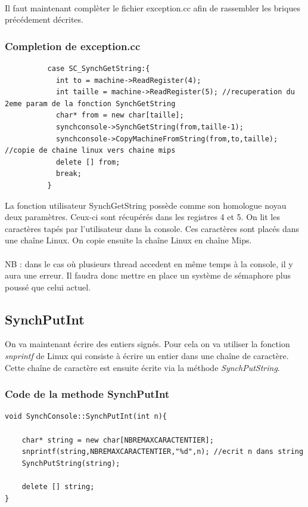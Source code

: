 \documentclass[a4paper,10pt]{article}
\begin{document}
     ~~\\
     Il faut maintenant complèter le fichier exception.cc afin de rassembler les briques précédement décrites.\\
    \textcolor{TealBlue}{\subsubsection*{Completion de exception.cc}}
    \begin{lstlisting}
          case SC_SynchGetString:{
            int to = machine->ReadRegister(4);
            int taille = machine->ReadRegister(5); //recuperation du 2eme param de la fonction SynchGetString
            char* from = new char[taille];
            synchconsole->SynchGetString(from,taille-1);
            synchconsole->CopyMachineFromString(from,to,taille); //copie de chaine linux vers chaine mips 
            delete [] from;
            break;
          }     
    \end{lstlisting}
    La fonction utilisateur SynchGetString possède comme son homologue noyau deux paramètres. Ceux-ci sont récupérés dans les registres 4 et 5. On lit les
    caractères tapés par l'utilisateur dans la console. Ces caractères sont placés dans une chaîne Linux. On copie ensuite la chaîne Linux en chaîne Mips.\\
    ~~\\
    NB : dans le cas où plusieurs thread accedent en même temps à la console, il y aura une erreur. Il faudra donc mettre en place un système de sémaphore plus
    poussé que celui actuel.
    \newpage
    \textcolor{NavyBlue}{\subsection{SynchPutInt}}
    On va maintenant écrire des entiers signés. Pour cela on va utiliser la fonction \emph{snprintf} de Linux qui consiste à écrire un entier dans une 
    chaîne de caractère. Cette chaîne de caractère est ensuite écrite via la méthode \emph{SynchPutString}.

    \textcolor{TealBlue}{\subsubsection*{Code de la methode SynchPutInt}}
    \begin{lstlisting}
void SynchConsole::SynchPutInt(int n){

	char* string = new char[NBREMAXCARACTENTIER];
	snprintf(string,NBREMAXCARACTENTIER,"%d",n); //ecrit n dans string 
	SynchPutString(string);

	delete [] string;
}     
    \end{lstlisting}
    
\end{document}
